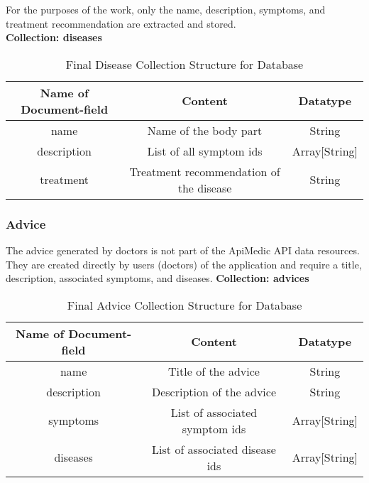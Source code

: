 For the purposes of the work, only the name, description, symptoms, and treatment recommendation are extracted and stored.
\newline \\
\textbf{Collection: diseases}
\begin{table}[H]
	\centering
	\begin{tabular}{ | c| c| c | } 
		\hline
		Name of Document-field& Content & Datatype \\ 
		\hline
		name & Name of the body part & String \\ 
		\hline
		description & List of all symptom ids & Array[String] \\ 
		\hline
		treatment & Treatment recommendation of the disease & String \\ 
		\hline
	\end{tabular}
			 \caption{Final Disease Collection Structure for Database}
\end{table}
\subsubsection{Advice}
The advice generated by doctors is not part of the ApiMedic API data resources. They are created directly by users (doctors) of the application and require a title, description, associated symptoms, and diseases.
 \newline
\textbf{Collection: advices}
\begin{table}[H]
	\centering
	\begin{tabular}{ | c| c| c | } 
		\hline
		Name of Document-field& Content & Datatype \\ 
		\hline
		name & Title of the advice& String \\ 
		\hline
		description & Description of the advice & String \\ 
		\hline
		symptoms & List of associated symptom ids & Array[String]\\ 
		\hline
		diseases & List of associated disease ids & Array[String]\\ 
		\hline
	\end{tabular}
\caption{Final Advice Collection Structure for Database}
\end{table}
